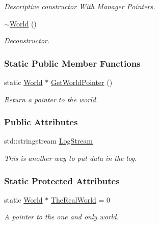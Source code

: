 \begin{DoxyCompactItemize}
\begin{DoxyCompactList}\small\item\em Descriptive constructor With Manager Pointers. \item\end{DoxyCompactList}\item 
\hyperlink{classphys_1_1World_a8b2c74c7e5d5ce3c46a814e183a7aff1}{$\sim$World} ()
\begin{DoxyCompactList}\small\item\em Deconstructor. \item\end{DoxyCompactList}\end{DoxyCompactItemize}
\subsubsection*{Static Public Member Functions}
\begin{DoxyCompactItemize}
\item 
static \hyperlink{classphys_1_1World}{World} $\ast$ \hyperlink{classphys_1_1World_ac7b8470a75353497bf8f85a8d3cd24e4}{GetWorldPointer} ()
\begin{DoxyCompactList}\small\item\em Return a pointer to the world. \item\end{DoxyCompactList}\end{DoxyCompactItemize}
\subsubsection*{Public Attributes}
\begin{DoxyCompactItemize}
\item 
std::stringstream \hyperlink{classphys_1_1World_a6d8b325a077afc924afb70c259ec0299}{LogStream}
\begin{DoxyCompactList}\small\item\em This is another way to put data in the log. \item\end{DoxyCompactList}\end{DoxyCompactItemize}
\subsubsection*{Static Protected Attributes}
\begin{DoxyCompactItemize}
\item 
\hypertarget{classphys_1_1World_a78f9e764aa85ac44d6f7fa7158377757}{
static \hyperlink{classphys_1_1World}{World} $\ast$ \hyperlink{classphys_1_1World_a78f9e764aa85ac44d6f7fa7158377757}{TheRealWorld} = 0}
\label{classphys_1_1World_a78f9e764aa85ac44d6f7fa7158377757}

\begin{DoxyCompactList}\small\item\em A pointer to the one and only world. \item\end{DoxyCompactList}\end{DoxyCompactItemize}


